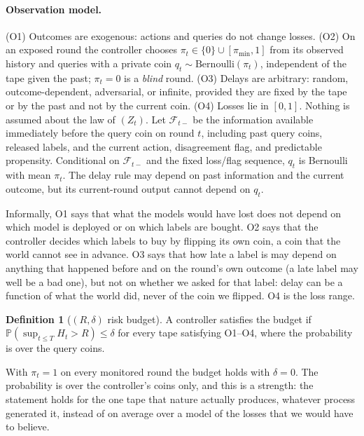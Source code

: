 \documentclass[10pt]{article}
\theoremstyle{plain}
\theoremstyle{definition}
\newtheorem{definition}{Definition}
\newcommand{\PP}{\mathbb{P}}
\begin{document}
\paragraph{Observation model.}
(O1) Outcomes are exogenous: actions and queries do not change losses. (O2) On an exposed round the controller chooses $\pi_t\in\{0\}\cup[\pi_{\min},1]$ from its observed history and queries with a private coin $q_t\sim\mathrm{Bernoulli}(\pi_t)$, independent of the tape given the past; $\pi_t=0$ is a \emph{blind} round. (O3) Delays are arbitrary: random, outcome-dependent, adversarial, or infinite, provided they are fixed by the tape or by the past and not by the current coin. (O4) Losses lie in $[0,1]$. Nothing is assumed about the law of $(Z_t)$. Let $\mathcal F_{t-}$ be the information available immediately before the query coin on round $t$, including past query coins, released labels, and the current action, disagreement flag, and predictable propensity. Conditional on $\mathcal F_{t-}$ and the fixed loss/flag sequence, $q_t$ is Bernoulli with mean $\pi_t$. The delay rule may depend on past information and the current outcome, but its current-round output cannot depend on $q_t$.

Informally, O1 says that what the models would have lost does not depend on which model is deployed or on which labels are bought. O2 says that the controller decides which labels to buy by flipping its own coin, a coin that the world cannot see in advance. O3 says that how late a label is may depend on anything that happened before and on the round's own outcome (a late label may well be a bad one), but not on whether we asked for that label: delay can be a function of what the world did, never of the coin we flipped. O4 is the loss range.

\begin{definition}[$(R,\delta)$ risk budget]
A controller satisfies the budget if $\PP(\sup_{t\le T}H_t>R)\le\delta$ for every tape satisfying O1--O4, where the probability is over the query coins.
\end{definition}
With $\pi_t=1$ on every monitored round the budget holds with $\delta=0$. The probability is over the controller's coins only, and this is a strength: the statement holds for the one tape that nature actually produces, whatever process generated it, instead of on average over a model of the losses that we would have to believe.
\end{document}
